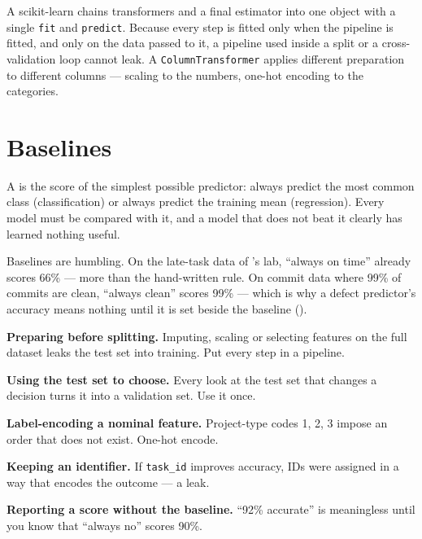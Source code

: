 \begin{definitionbox}[Pipeline]
A scikit-learn  chains transformers and a final estimator into one
object with a single \texttt{fit} and \texttt{predict}. Because every step is fitted
only when the pipeline is fitted, and only on the data passed to it, a pipeline
used inside a split or a cross-validation loop cannot leak. A
\texttt{ColumnTransformer} applies different preparation to different columns
--- scaling to the numbers, one-hot encoding to the categories.
\end{definitionbox}

\section{Baselines}

\begin{definitionbox}[Baseline]
A  is the score of the simplest possible predictor: always predict
the most common class (classification) or always predict the training mean
(regression). Every model must be compared with it, and a model that does not
beat it clearly has learned nothing useful.
\end{definitionbox}

Baselines are humbling. On the late-task data of 's lab,
``always on time'' already scores 66\% --- more than the hand-written rule. On
commit data where 99\% of commits are clean, ``always clean'' scores 99\% ---
which is why a defect predictor's accuracy means nothing until it is set beside
the baseline ().

\begin{pitfall}
\begin{tight}
  \item \textbf{Preparing before splitting.} Imputing, scaling or selecting
        features on the full dataset leaks the test set into training. Put every
        step in a pipeline.
  \item \textbf{Using the test set to choose.} Every look at the test set that
        changes a decision turns it into a validation set. Use it once.
  \item \textbf{Label-encoding a nominal feature.} Project-type codes 1, 2, 3 impose
        an order that does not exist. One-hot encode.
  \item \textbf{Keeping an identifier.} If \texttt{task\_id} improves accuracy,
        IDs were assigned in a way that encodes the outcome --- a leak.
  \item \textbf{Reporting a score without the baseline.} ``92\% accurate'' is
        meaningless until you know that ``always no'' scores 90\%.
\end{tight}
\end{pitfall}

